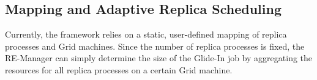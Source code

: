 \documentclass{rspublic}
\newcommand{\glidein}[1]{Glide-In }
\newcommand{\replicaagent}[1]{Replica-Agent }
\begin{document}
\subsection{Mapping and Adaptive Replica Scheduling}

Currently, the framework relies on a static, user-defined 
mapping of replica processes and Grid machines.
Since the number of replica processes is fixed, the RE-Manager can
simply determine the size of the Glide-In job by aggregating 
the resources for all replica processes on a certain Grid machine.

\end{document}
